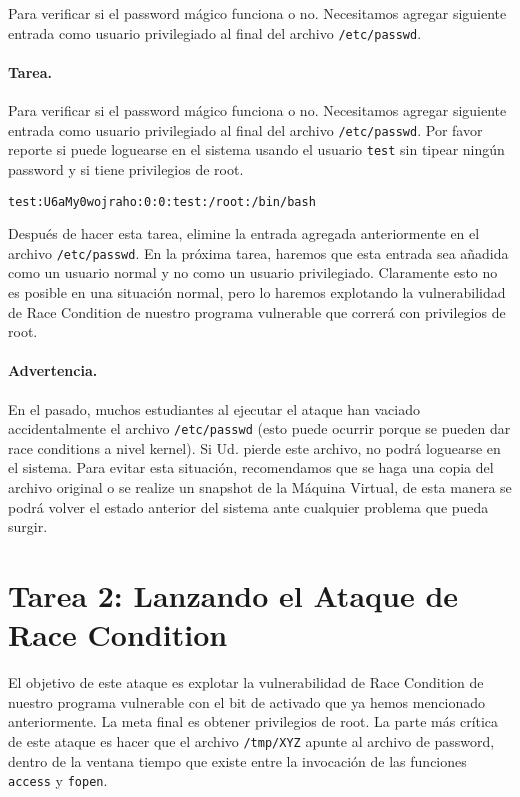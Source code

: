 Para verificar si el password mágico funciona o no. Necesitamos agregar siguiente  entrada como usuario privilegiado al final del archivo \texttt{/etc/passwd}.
\paragraph{Tarea.} Para verificar si el password mágico funciona o no. Necesitamos agregar siguiente  entrada como usuario privilegiado al final del archivo \texttt{/etc/passwd}.
Por favor reporte si puede loguearse en el sistema usando el usuario  \texttt{test} sin tipear ningún password y si tiene privilegios de root.

\begin{lstlisting}
test:U6aMy0wojraho:0:0:test:/root:/bin/bash
\end{lstlisting}

Después de hacer esta tarea, elimine la entrada agregada anteriormente en el archivo \texttt{/etc/passwd}. En la próxima tarea, haremos que esta entrada sea añadida como un usuario normal y no como un usuario privilegiado. Claramente esto no es posible en una situación normal, pero lo haremos explotando la vulnerabilidad de Race Condition de nuestro programa vulnerable que correrá con privilegios de root.


\paragraph{Advertencia.}
En el pasado, muchos estudiantes al ejecutar el ataque han vaciado accidentalmente el archivo {\tt /etc/passwd} (esto puede ocurrir porque se pueden dar race conditions a nivel kernel). Si Ud. pierde este archivo, no podrá loguearse en el sistema. Para evitar esta situación, recomendamos que se haga una copia del archivo original o se realize un snapshot de la Máquina Virtual, de esta manera se podrá volver el estado anterior del sistema ante cualquier problema que pueda surgir.



\section{Tarea 2: Lanzando el Ataque de Race Condition}

El objetivo de este ataque es explotar la vulnerabilidad de Race Condition de nuestro programa vulnerable con el bit de \setuid activado que ya hemos mencionado anteriormente. La meta final es obtener privilegios de root. La parte más crítica de este ataque es hacer que el archivo \texttt{/tmp/XYZ} apunte al archivo de password, dentro de la ventana tiempo que existe entre la invocación de las funciones \texttt{access} y \texttt{fopen}.

